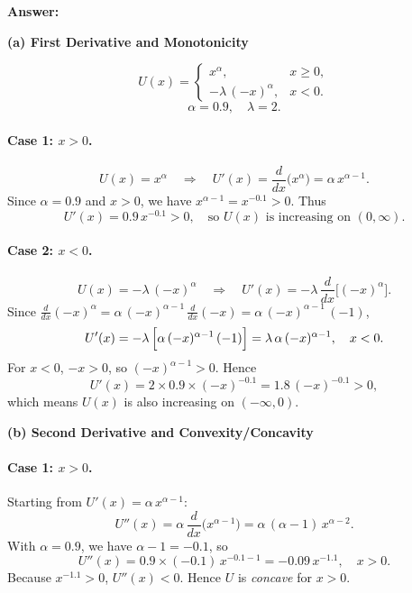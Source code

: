 \documentclass[12pt]{article}
\begin{document}
\vspace{1cm}

\noindent \textbf{Answer:}

\bigskip

\noindent
\textbf{(a) First Derivative and Monotonicity}

\[
U(x) = 
\begin{cases}
x^\alpha, & x \ge 0,\\
-\lambda\,(-x)^\alpha, & x < 0.
\end{cases}
\]
\[
\alpha = 0.9, \quad \lambda = 2.
\]

\paragraph{Case 1: \(x>0\).} 
\[
U(x) = x^\alpha 
\quad \Longrightarrow \quad
U'(x) = \frac{d}{dx}\bigl(x^\alpha\bigr) = \alpha\, x^{\alpha - 1}.
\]
Since \(\alpha = 0.9\) and \(x>0\), we have \(x^{\alpha-1} = x^{-0.1} > 0\). Thus
\[
U'(x) = 0.9\, x^{-0.1} > 0,\quad \text{so }U(x)\text{ is increasing on }(0,\infty).
\]

\paragraph{Case 2: \(x<0\).} 
\[
U(x) = -\lambda\,(-x)^\alpha
\quad \Longrightarrow \quad
U'(x) = -\lambda \,\frac{d}{dx}\bigl[(-x)^\alpha\bigr].
\]
Since \(\frac{d}{dx}(-x)^\alpha = \alpha\,(-x)^{\alpha-1}\, \frac{d}{dx}(-x) = \alpha\,(-x)^{\alpha-1} \,(-1)\),
\[
U'(x) 
= -\lambda \,\Bigl[\alpha\,(-x)^{\alpha-1}\,(-1)\Bigr]
= \lambda\,\alpha\,(-x)^{\alpha-1}, \quad x<0.
\]
For \(x<0\), \(-x>0\), so \((-x)^{\alpha-1} >0\). Hence
\[
U'(x) = 2 \times 0.9 \times (-x)^{-0.1} = 1.8\,(-x)^{-0.1} >0,
\]
which means \(U(x)\) is also increasing on \((-\infty,0)\).

\bigskip
\noindent
\textbf{(b) Second Derivative and Convexity/Concavity}

\paragraph{Case 1: \(x>0\).} 
Starting from \(U'(x) = \alpha\, x^{\alpha-1}\):
\[
U''(x) = \alpha \,\frac{d}{dx}\bigl(x^{\alpha - 1}\bigr) 
= \alpha\,(\alpha - 1)\,x^{\alpha - 2}.
\]
With \(\alpha=0.9\), we have \(\alpha - 1 = -0.1\), so
\[
U''(x) = 0.9 \times (-0.1)\, x^{-0.1 -1}
= -0.09\, x^{-1.1}, \quad x>0.
\]
Because \(x^{-1.1}>0\), \(U''(x)<0\). Hence \(U\) is \emph{concave} for \(x>0\).
\end{document}
